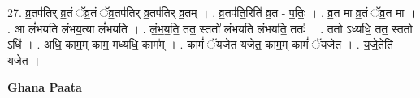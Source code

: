 \documentclass[17pt]{extarticle}
\begin{document}
27. व्र॒तप॑तिर् व्र॒तं ॅव्र॒तं ॅव्र॒तप॑तिर् व्र॒तप॑तिर् व्र॒तम् । . व्र॒तप॑ति॒रिति॑ व्र॒त - प॒तिः॒ । . व्र॒त मा व्र॒तं ॅव्र॒त मा । . आ लं॑भयति लंभय॒त्या लं॑भयति । . लं॒भ॒य॒ति॒ तत॒ स्ततो॑ लंभयति लंभयति॒ ततः॑ । . ततो ऽध्यधि॒ तत॒ स्ततो ऽधि॑ । . अधि॒ काम॒म् काम॒ मध्यधि॒ काम᳚म् । . कामं॑ ॅयजेत यजेत॒ काम॒म् कामं॑ ॅयजेत । . य॒जे॒तेति॑ यजेत । \newline

\textbf{Ghana Paata } \newline
\end{document}
